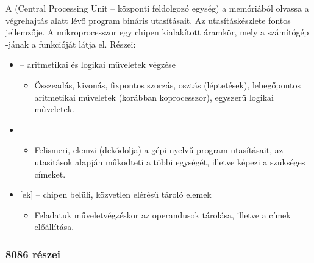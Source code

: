 \documentclass[../main.tex]{subfiles}
\begin{document}
A  (Central Processing Unit -- központi feldolgozó egység) a
memóriából olvassa a végrehajtás alatt lévő program bináris utasításait.
Az utasításkészlete fontos jellemzője. A mikroprocesszor egy chipen kialakított
áramkör, mely a számítógép -jának a funkcióját látja el. Részei:
\begin{itemize}
  \item {} -- aritmetikai és logikai műveletek végzése
        \begin{itemize}
          \item Összeadás, kivonás, fixpontos szorzás, osztás (léptetések),
                lebegőpontos aritmetikai műveletek (korábban koprocesszor),
                egyszerű logikai műveletek.
        \end{itemize}

  \item {}
        \begin{itemize}
          \item Felismeri, elemzi (dekódolja) a gépi nyelvű
                program utasításait, az utasítások alapján működteti
                a  többi egységét, illetve képezi a szükséges címeket.
        \end{itemize}

  \item {}[ek] --
        chipen belüli, közvetlen elérésű tároló elemek
        \begin{itemize}
          \item Feladatuk műveletvégzéskor az operandusok tárolása,
                illetve a címek előállítása.
        \end{itemize}
\end{itemize}

\subsubsection*{8086 részei}
\end{document}
